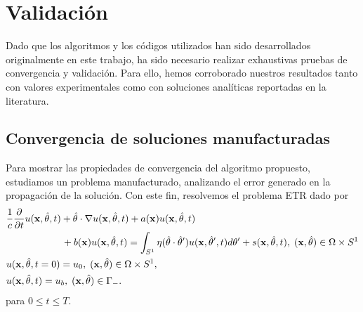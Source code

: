 \section{Validación}

Dado que los algoritmos y los códigos utilizados han sido desarrollados 
originalmente en este trabajo, ha sido necesario realizar exhaustivas 
pruebas de convergencia y validación. Para ello, 
hemos corroborado nuestros resultados tanto con valores experimentales 
como con soluciones analíticas reportadas en la literatura.

\subsection{Convergencia de soluciones manufacturadas}
\label{sec:manufacturada}

Para mostrar las propiedades de convergencia del algoritmo propuesto,
estudiamos un problema manufacturado, analizando el error generado en la propagación de 
la solución.
Con este fin, resolvemos el problema ETR dado por 
\begin{equation*}
\begin{split}
\begin{aligned}
&\frac{1}{c}\frac{\partial }{\partial t}u(\mathbf{x},\hat{\theta},t) + \hat{\theta} \cdot \nabla u(\mathbf{x},\hat{\theta},t)+a(\mathbf{x})u(\mathbf{x},\hat{\theta},t)  \\
&\quad \quad \quad  \quad \quad \; \;\,  +b(\mathbf{x})u(\mathbf{x},\hat{\theta},t) = \int_{S^1}\eta(\hat{\theta}\cdot\hat{\theta} ') 
u(\mathbf{x},\hat \theta',t) d\theta'+s(\mathbf{x},\hat{\theta},t),  \; (\mathbf{x},\hat{\theta})  \in \Omega\times S^1\\
&u(\mathbf{x},\hat{\theta},t=0)=u_0, \; (\mathbf{x},\hat{\theta})  \in \Omega\times S^1,  \\
&u(\mathbf{x},\hat{\theta},t)=u_b, \; (\mathbf{x},\hat{\theta}) \in \Gamma_-. \notag
\end{aligned}
\end{split}
\label{eq:RTEdisp}
\end{equation*}
para $0\leq t \leq T$. 

